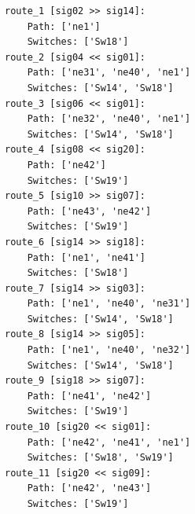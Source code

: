 	\begin{lstlisting}[language = {}, caption = Routes.RNA, label = {lst:EJ7_7}]
route_1 [sig02 >> sig14]:
	Path: ['ne1']
	Switches: ['Sw18']
route_2 [sig04 << sig01]:
	Path: ['ne31', 'ne40', 'ne1']
	Switches: ['Sw14', 'Sw18']
route_3 [sig06 << sig01]:
	Path: ['ne32', 'ne40', 'ne1']
	Switches: ['Sw14', 'Sw18']
route_4 [sig08 << sig20]:
	Path: ['ne42']
	Switches: ['Sw19']
route_5 [sig10 >> sig07]:
	Path: ['ne43', 'ne42']
	Switches: ['Sw19']
route_6 [sig14 >> sig18]:
	Path: ['ne1', 'ne41']
	Switches: ['Sw18']
route_7 [sig14 >> sig03]:
	Path: ['ne1', 'ne40', 'ne31']
	Switches: ['Sw14', 'Sw18']
route_8 [sig14 >> sig05]:
	Path: ['ne1', 'ne40', 'ne32']
	Switches: ['Sw14', 'Sw18']
route_9 [sig18 >> sig07]:
	Path: ['ne41', 'ne42']
	Switches: ['Sw19']
route_10 [sig20 << sig01]:
	Path: ['ne42', 'ne41', 'ne1']
	Switches: ['Sw18', 'Sw19']
route_11 [sig20 << sig09]:
	Path: ['ne42', 'ne43']
	Switches: ['Sw19']
	\end{lstlisting}